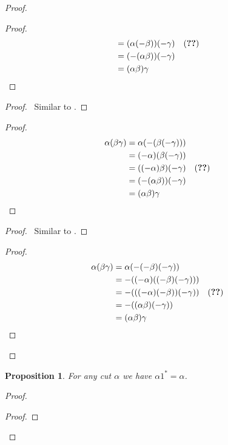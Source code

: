 \documentclass{book}
\let\qed\relax
\newtheorem{prop}{Proposition}[chapter]
\theoremstyle{definition}
\begin{document}
\begin{proof}
\begin{proof}
\begin{align*}
		& = (\alpha (-\beta)) (-\gamma) & (\text{\stepref{1}}) \\
		& = (-(\alpha \beta))(- \gamma) \\
		& = (\alpha \beta) \gamma
	\end{align*}
\end{proof}
\begin{proof}
	\pf\ Similar to .
\end{proof}
\begin{proof}
	\pf
	\begin{align*}
		\alpha (\beta \gamma) & = \alpha (-(\beta(-\gamma))) \\
		& = (-\alpha)(\beta(-\gamma)) \\
		& = ((-\alpha) \beta)(- \gamma) & (\text{\stepref{1}}) \\
		& = (-(\alpha \beta))(-\gamma) \\
		& = (\alpha \beta) \gamma
	\end{align*}
\end{proof}
\begin{proof}
	\pf\ Similar to .
\end{proof}
\begin{proof}
	\pf
	\begin{align*}
		\alpha (\beta \gamma) & = \alpha (-(-\beta)(-\gamma)) \\
		& = -((-\alpha)((-\beta)(-\gamma))) \\
		& = -(((- \alpha)(- \beta)) (-\gamma)) & (\text{\stepref{1}}) \\
		& = -((\alpha \beta) (-\gamma)) \\
		& = (\alpha \beta) \gamma
	\end{align*}
\end{proof}
\qed
\end{proof}

\begin{prop}
For any cut $\alpha$ we have $\alpha 1^* = \alpha$.
\end{prop}

\begin{proof} %
\pf
{}
\begin{proof}
\end{proof}
\qed
\end{proof}
\end{document}
